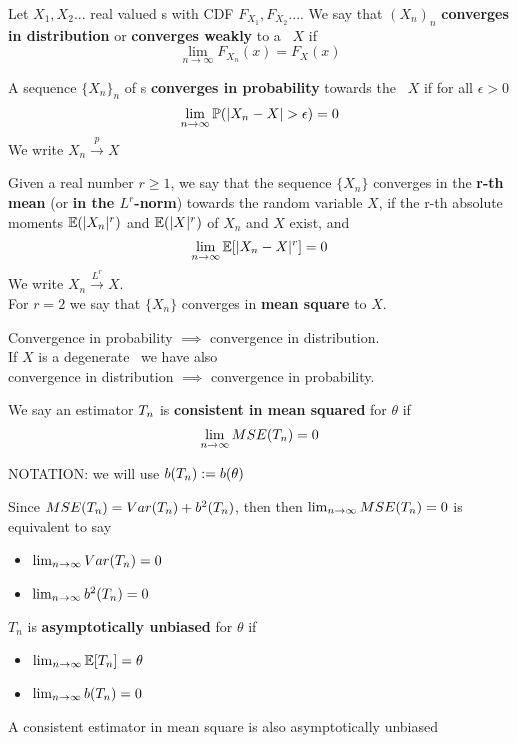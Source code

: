 \begin{defi}
	Let $X_1, X_2...$ real valued  \rv s with CDF $F_{X_1},F_{X_2}...$. We say that $(X_n)_n$ \textbf{converges in distribution} or \textbf{converges weakly} to a \rv  \  $X$ if $$\lim_{n\to \infty}F_{X_n}(x)=F_X(x)$$
\end{defi}
\begin{defi}
	A sequence $\{ X_n\}_n$ of \rv s \textbf{converges in probability} towards the \rv \ $X$ if for all $\epsilon>0$
	$$\lim_{n\to \infty}\p(|X_n-X|>\epsilon)=0$$
	We write $X_n\xrightarrow{p}X$
\end{defi}
\begin{defi}
	Given a real number $r \geq 1$, we say that the sequence $\{X_n\}$ converges in the \textbf{r-th mean} (or \textbf{in the $L^r$-norm}) towards the random variable $X$, if the r-th absolute moments $\mathbb{E}(|X_n|^r)$ and $\mathbb{E}(|X|^r)$ of $X_n$ and $X$ exist, and
	$$\lim_{n\to \infty}\mathbb{E}[|X_n-X|^r]=0$$
	We write $X_n \xrightarrow{L^r} X$.\\
	For $r=2$ we say that $\{X_n\}$ converges in \textbf{mean square}  to $X$.
\end{defi}

\begin{prop}
	Convergence in probability $\implies$ convergence in distribution.\\
	If $X$ is a degenerate \rv \ we have also\\  convergence in distribution $\implies$ convergence in probability.
\end{prop}
\begin{defi}
	We say an estimator $T_{n}$ is \textbf{consistent in mean squared} for $\theta$ if 
	$$\lim_{n\to \infty}MSE(T_{n})=0$$
\end{defi}
NOTATION: we will use $b(T_{n}):=b(\theta)$
\begin{oss}
	Since $MSE(T_{n})=Var(T_n)+b^2(T_{n})$, then then $\lim_{n\to \infty}MSE(T_{n})=0$ is equivalent to say
	\begin{itemize}
		\item  $\lim_{n\to \infty}Var(T_{n})=0$
		\item $\lim_{n\to \infty}b^2(T_{n})=0$
	\end{itemize}
\end{oss}
\begin{defi}
	$T_n$ is \textbf{asymptotically unbiased} for $\theta$ if
	\begin{itemize}
		\item $\lim_{n\to \infty}\mathbb{E}[T_{n}]=\theta$
		\item $\lim_{n\to \infty}b(T_{n})=0$
	\end{itemize}
\end{defi}
\begin{prop}
	A consistent estimator in mean square is also asymptotically unbiased
\end{prop}

